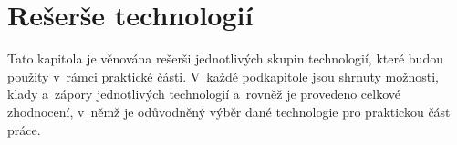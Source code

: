 \chapter{Rešerše technologií}
\label{chap:technology-research}

Tato kapitola je věnována rešerši jednotlivých skupin technologií,
které budou použity v~rámci praktické části.
V~každé podkapitole jsou shrnuty možnosti, klady a~zápory jednotlivých
technologií a~rovněž je provedeno celkové zhodnocení,
v~němž je odůvodněný výběr dané technologie pro praktickou část práce.






\pagebreak

